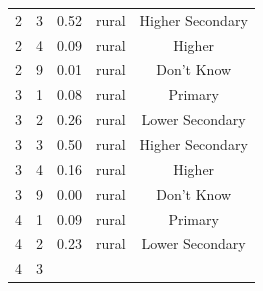 \documentclass[stu, 12pt, floatsintext,longtable]{apa7}
\begin{document}
\begin{longtable}{ccccc}
    \\
    2                                                  & 3                    &
    0.52                                               &
    rural                                              & Higher Secondary
    \\
    2                                                  & 4                    &
    0.09                                               &
    rural                                              & Higher
    \\
    2                                                  & 9                    &
    0.01                                               &
    rural                                              & Don't Know
    \\
    3                                                  & 1                    &
    0.08                                               &
    rural                                              & Primary
    \\
    3                                                  & 2                    &
    0.26                                               &
    rural                                              & Lower Secondary
    \\
    3                                                  & 3                    &
    0.50                                               &
    rural                                              & Higher Secondary
    \\
    3                                                  & 4                    &
    0.16                                               &
    rural                                              & Higher
    \\
    3                                                  & 9                    &
    0.00                                               &
    rural                                              & Don't Know
    \\
    4                                                  & 1                    &
    0.09                                               &
    rural                                              & Primary
    \\
    4                                                  & 2                    &
    0.23                                               &
    rural                                              & Lower Secondary
    \\
    4                                                  & 3                    &

\end{longtable}
\end{document}
